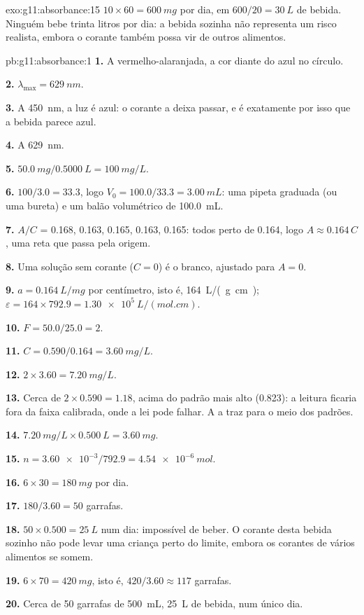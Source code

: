 \begin{solution}{exo:g11:absorbance:15}
$10 \times 60 = \qty{600}{mg}$ por dia, em $600 / 20 = \qty{30}{L}$ de
bebida. Ninguém bebe trinta litros por dia: a bebida sozinha não
representa um risco realista, embora o corante também possa vir de
outros alimentos.
\end{solution}

\begin{solution}{pb:g11:absorbance:1}
\textbf{1.} A vermelho-alaranjada, a cor diante do azul no círculo.

\textbf{2.} $\lambda_{\max} = \qty{629}{nm}$.

\textbf{3.} A \qty{450}{nm}, a luz é azul: o corante a deixa passar, e é
exatamente por isso que a bebida parece azul.

\textbf{4.} A \qty{629}{nm}.

\textbf{5.} $\qty{50.0}{mg} / \qty{0.5000}{L} = \qty{100}{mg/L}$.

\textbf{6.}  $100 / 3.0 = 33.3$, logo
$V_0 = 100.0 / 33.3 = \qty{3.00}{mL}$: uma pipeta graduada (ou uma
bureta) e um balão volumétrico de \qty{100.0}{mL}.

\textbf{7.} $A/C$ = 0.168, 0.163, 0.165, 0.163, 0.165: todos perto de
0.164, logo $A \approx 0.164\, C$, uma reta que passa pela origem.

\textbf{8.} Uma solução sem corante ($C = 0$) é o branco, ajustado para
$A = 0$.

\textbf{9.} $a = \qty{0.164}{L/mg}$ por centímetro, isto é,
\qty{164}{L/(g.cm)}; $\varepsilon = 164 \times 792.9 =
\qty{1.30e5}{L/(mol.cm)}$.

\textbf{10.} $F = 50.0 / 25.0 = 2$.

\textbf{11.} $C = 0.590 / 0.164 = \qty{3.60}{mg/L}$.

\textbf{12.} $2 \times 3.60 = \qty{7.20}{mg/L}$.

\textbf{13.} Cerca de $2 \times 0.590 = 1.18$, acima do padrão mais alto
(0.823): a leitura ficaria fora da faixa calibrada, onde a lei pode
falhar. A  a traz para o meio dos padrões.

\textbf{14.} $\qty{7.20}{mg/L} \times \qty{0.500}{L} = \qty{3.60}{mg}$.

\textbf{15.} $n = \num{3.60e-3} / 792.9 = \qty{4.54e-6}{mol}$.

\textbf{16.} $6 \times 30 = \qty{180}{mg}$ por dia.

\textbf{17.} $180 / 3.60 = 50$ garrafas.

\textbf{18.} $50 \times 0.500 = \qty{25}{L}$ num dia: impossível de beber.
O corante desta bebida sozinho não pode levar uma criança perto do
limite, embora os corantes de vários alimentos se somem.

\textbf{19.} $6 \times 70 = \qty{420}{mg}$, isto é, $420 / 3.60 \approx
117$ garrafas.

\textbf{20.} Cerca de 50 garrafas de \qty{500}{mL}, \qty{25}{L} de
bebida, num único dia.
\end{solution}
